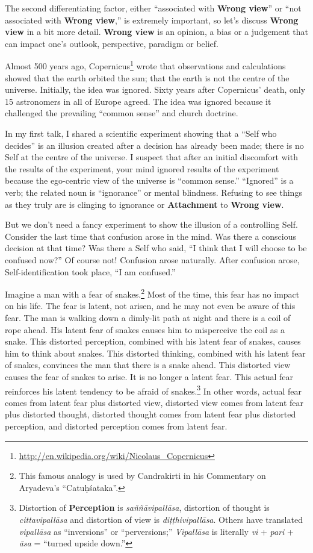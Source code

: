 The second differentiating factor, either “associated with \textbf{Wrong view}” or “not associated with \textbf{Wrong view},” is extremely important, so let’s discuss \textbf{Wrong view} in a bit more detail. \textbf{Wrong view} is an opinion, a bias or a judgement that can impact one’s outlook, perspective, paradigm or belief.

Almost 500 years ago, Copernicus\footnote{\url{http://en.wikipedia.org/wiki/Nicolaus_Copernicus}} wrote that observations and calculations showed that the earth orbited the sun; that the earth is not the centre of the universe. Initially, the idea was ignored. Sixty years after Copernicus’ death, only 15 astronomers in all of Europe agreed. The idea was ignored because it challenged the prevailing “common sense” and church doctrine.

In my first talk, I shared a scientific experiment showing that a “Self who decides” is an illusion created after a decision has already been made; there is no Self at the centre of the universe. I suspect that after an initial discomfort with the results of the experiment, your mind ignored results of the experiment because the ego-centric view of the universe is “common sense.” “Ignored” is a verb; the related noun is “ignorance” or mental blindness. Refusing to see things as they truly are is clinging to ignorance or \textbf{Attachment} to \textbf{Wrong view}.

But we don’t need a fancy experiment to show the illusion of a controlling Self. Consider the last time that confusion arose in the mind. Was there a conscious decision at that time? Was there a Self who said, “I think that I will choose to be confused now?” Of course not! Confusion arose naturally. After confusion arose, Self-identification took place, “I am confused.”

Imagine a man with a fear of snakes.\footnote{This famous analogy is used by Candrakirti in his Commentary on Aryadeva’s “Catuḥśataka”.} Most of the time, this fear has no impact on his life. The fear is latent, not arisen, and he may not even be aware of this fear. The man is walking down a dimly-lit path at night and there is a coil of rope ahead. His latent fear of snakes causes him to misperceive the coil as a snake. This distorted perception, combined with his latent fear of snakes, causes him to think about snakes. This distorted thinking, combined with his latent fear of snakes, convinces the man that there is a snake ahead. This distorted view causes the fear of snakes to arise. It is no longer a latent fear. This actual fear reinforces his latent tendency to be afraid of snakes.\footnote{Distortion of \textbf{Perception} is \textit{saññāvipallāsa}, distortion of thought is \textit{cittavipallāsa} and distortion of view is \textit{diṭṭhivipallāsa}. Others have translated \textit{vipallāsa} as “inversions” or “perversions;” \textit{Vipallāsa} is literally \textit{vi} + \textit{pari} + \textit{āsa} = “turned upside down.”} In other words, actual fear comes from latent fear plus distorted view, distorted view comes from latent fear plus distorted thought, distorted thought comes from latent fear plus distorted perception, and distorted perception comes from latent fear.


